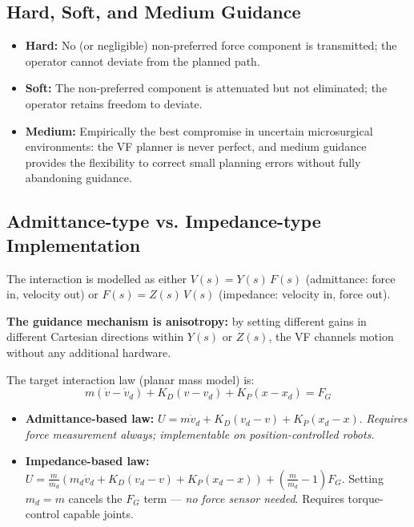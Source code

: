 \documentclass[11pt,a4paper,twoside]{report}
\begin{document}
\subsection{Hard, Soft, and Medium Guidance}
\begin{itemize}
    \item \textbf{Hard:} No (or negligible) non-preferred force component is transmitted; the operator cannot deviate from the planned path.
    \item \textbf{Soft:} The non-preferred component is attenuated but not eliminated; the operator retains freedom to deviate.
    \item \textbf{Medium:} Empirically the best compromise in uncertain microsurgical environments: the VF planner is never perfect, and medium guidance provides the flexibility to correct small planning errors without fully abandoning guidance.
\end{itemize}

\subsection{Admittance-type vs. Impedance-type Implementation}
The interaction is modelled as either $V(s) = Y(s)\,F(s)$ (admittance: force in, velocity out) or $F(s) = Z(s)\,V(s)$ (impedance: velocity in, force out).

\textbf{The guidance mechanism is anisotropy:} by setting different gains in different Cartesian directions within $Y(s)$ or $Z(s)$, the VF channels motion without any additional hardware.

The target interaction law (planar mass model) is:
\begin{equation}
    m(\dot{v} - \dot{v}_d) + K_D(v - v_d) + K_P(x - x_d) = F_G
\end{equation}
\begin{itemize}
    \item \textbf{Admittance-based law:} $U = m\dot{v}_d + K_D(v_d - v) + K_P(x_d - x)$. \textit{Requires force measurement always; implementable on position-controlled robots.}
    \item \textbf{Impedance-based law:} $U = \frac{m}{m_d}(m_d\dot{v}_d + K_D(v_d - v) + K_P(x_d - x)) + \left(\frac{m}{m_d} - 1\right)F_G$. Setting $m_d = m$ cancels the $F_G$ term — \textit{no force sensor needed}. Requires torque-control capable joints.
\end{itemize}
\end{document}
